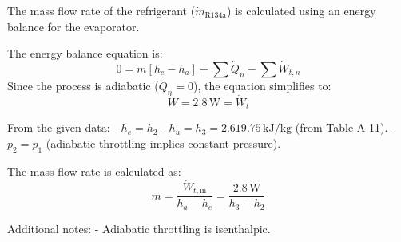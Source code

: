 The mass flow rate of the refrigerant (\( \dot{m}_{\text{R134a}} \)) is calculated using an energy balance for the evaporator.  

The energy balance equation is:  
\[
0 = \dot{m} \left[ h_e - h_a \right] + \sum \dot{Q}_n - \sum \dot{W}_{t,n}
\]  
Since the process is adiabatic (\( \dot{Q}_n = 0 \)), the equation simplifies to:  
\[
\dot{W} = 2.8 \, \text{W} = \dot{W}_t
\]  

From the given data:  
- \( h_e = h_2 \)  
- \( h_u = h_3 = 2.619.75 \, \text{kJ/kg} \) (from Table A-11).  
- \( p_2 = p_1 \) (adiabatic throttling implies constant pressure).  

The mass flow rate is calculated as:  
\[
\dot{m} = \frac{\dot{W}_{t,\text{in}}}{h_a - h_e} = \frac{2.8 \, \text{W}}{h_3 - h_2}
\]  

Additional notes:  
- Adiabatic throttling is isenthalpic.